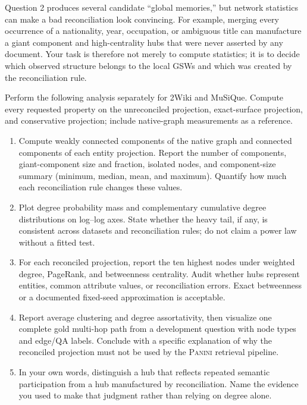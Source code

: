 \documentclass[11pt]{article}
\newcommand{\PANINI}{{\mdseries\textsc{Panini}}\xspace}
\begin{document}
Question 2 produces several candidate ``global memories,'' but network
statistics can make a bad reconciliation look convincing. For example,
merging every occurrence of a nationality, year, occupation, or ambiguous
title can manufacture a giant component and high-centrality hubs that were
never asserted by any document. Your task is therefore not merely to compute
statistics; it is to decide which observed structure belongs to the local GSWs
and which was created by the reconciliation rule.

Perform the following analysis separately for 2Wiki and MuSiQue. Compute every
requested property on the unreconciled projection, exact-surface projection,
and conservative projection; include native-graph measurements as a reference.

\begin{enumerate}[label=(\alph*)]
  \item Compute weakly connected components of the native graph and connected
        components of each entity projection. Report the number of components,
        giant-component size and fraction, isolated nodes, and component-size
        summary (minimum, median, mean, and maximum). Quantify how much each
        reconciliation rule changes these values.
  \item Plot degree probability mass and complementary cumulative degree
        distributions on log--log axes. State whether the heavy tail, if any,
        is consistent across datasets and reconciliation rules; do not claim a
        power law without a fitted test.
  \item For each reconciled projection, report the ten highest nodes under
        weighted degree, PageRank, and betweenness centrality. Audit whether
        hubs represent entities, common attribute values, or reconciliation
        errors. Exact betweenness or a documented fixed-seed approximation is
        acceptable.
  \item Report average clustering and degree assortativity, then visualize one
        complete gold multi-hop path from a development question with node
        types and edge/QA labels. Conclude with a specific explanation of why
        the reconciled projection must not be used by the \PANINI retrieval
        pipeline.
  \item In your own words, distinguish a hub that reflects repeated semantic
        participation from a hub manufactured by reconciliation. Name the
        evidence you used to make that judgment rather than relying on degree
        alone.
\end{enumerate}
\end{document}
